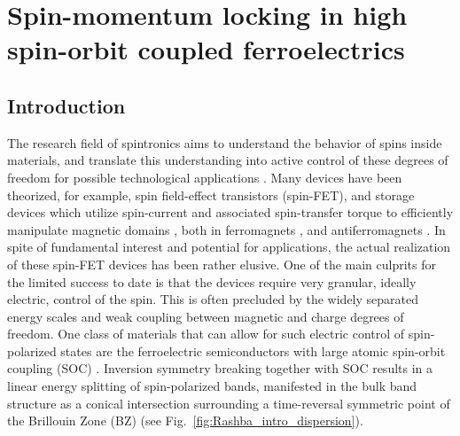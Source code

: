 \newcommand{\Unkr}{u_n(\bm{k}, \bm{r})}
\newcommand{\Eikr}{e^{i\bm{k}\cdot\bm{r}}}
\chapter{Spin-momentum locking in high spin-orbit coupled ferroelectrics \label{ch:Rashba}}
\section{Introduction}
%
The research field of spintronics aims to understand the behavior of spins inside materials, and translate this understanding into active control of these degrees of freedom for possible technological applications \cite{Joshi2016}.
Many devices have been theorized, for example, spin field-effect transistors (spin-FET)\cite{Datta1990}, and storage devices which utilize spin-current and associated spin-transfer torque to efficiently manipulate magnetic domains \cite{Kent2015}, both in ferromagnets \cite{Nunez2011}, and antiferromagnets \cite{Jungwirth2016}.
In spite of fundamental interest and potential for applications, the actual realization of these spin-FET devices has been rather elusive.
One of the main culprits for the limited success to date is that the devices require very granular, ideally electric, control of the spin.
This is often precluded by the widely separated energy scales and weak coupling between magnetic and charge degrees of freedom.
One class of materials that can allow for such electric control of spin-polarized states are the ferroelectric semiconductors with large atomic spin-orbit coupling (SOC) \cite{Picozzi2014,DiSante2013,Ishizaka2011,Kim2014}.
Inversion symmetry breaking together with SOC results in a linear energy splitting of spin-polarized bands, manifested in the bulk band structure as a conical intersection surrounding a time-reversal symmetric point of the Brillouin Zone (BZ) (see Fig.~\ref{fig:Rashba_intro_dispersion}).
